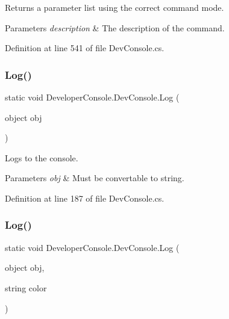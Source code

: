 Returns a parameter list using the correct command mode. 


\begin{DoxyParams}{Parameters}
{\em description} & The description of the command.\\
\hline
\end{DoxyParams}


Definition at line 541 of file Dev\+Console.\+cs.

\mbox{\label{class_developer_console_1_1_dev_console_a1e1066a6536ffcb97b98fa0083dddc42}} 
\subsubsection{\texorpdfstring{Log()}{Log()}\hspace{0.1cm}{\footnotesize\ttfamily [1/2]}}
{\footnotesize\ttfamily static void Developer\+Console.\+Dev\+Console.\+Log (\begin{DoxyParamCaption}\item[{object}]{obj }\end{DoxyParamCaption})\hspace{0.3cm}{\ttfamily [static]}}



Logs to the console. 


\begin{DoxyParams}{Parameters}
{\em obj} & Must be convertable to string.\\
\hline
\end{DoxyParams}


Definition at line 187 of file Dev\+Console.\+cs.

\mbox{\label{class_developer_console_1_1_dev_console_a14fdb350c2590a23ec30fb80ccfced64}} 
\subsubsection{\texorpdfstring{Log()}{Log()}\hspace{0.1cm}{\footnotesize\ttfamily [2/2]}}
{\footnotesize\ttfamily static void Developer\+Console.\+Dev\+Console.\+Log (\begin{DoxyParamCaption}\item[{object}]{obj,  }\item[{string}]{color }\end{DoxyParamCaption})\hspace{0.3cm}{\ttfamily [static]}}



